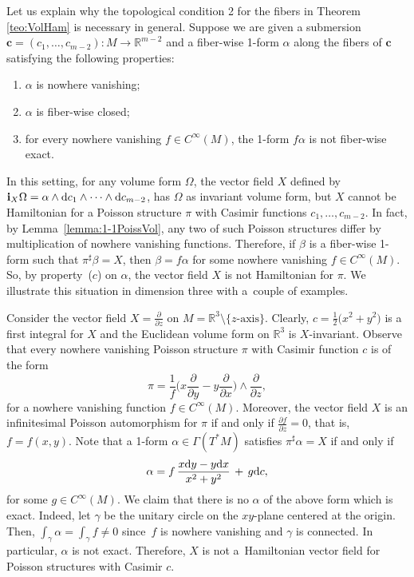 \documentclass[pdftex]{sigma}%
\newcommand{\R}[1]{\mathbb{R}^{#1}}
\newcommand{\dd}{{\rm d}}
\newcommand{\ii}{\mathbf{i}}
\numberwithin{equation}{section}
\begin{document}
Let us explain why the topological condition 2 for the fibers in Theorem \ref{teo:VolHam} is necessary in general. Suppose we are given a submersion $\boldsymbol{c}=(c_1, \dots, c_{m-2})\colon M \to \R{m-2}$ and a fiber-wise 1-form $\alpha$ along the fibers of $\boldsymbol{c}$ satisfying the following properties:
 \begin{enumerate}\itemsep=0pt
 \item[$(a)$] $\alpha$ is nowhere vanishing;
 \item[$(b)$] $\alpha$ is fiber-wise closed;
 \item[$(c)$] for every nowhere vanishing $f\in C^{\infty}(M)$, the 1-form $f\alpha$ is not fiber-wise exact.
 \end{enumerate}
In this setting, for any volume form $\Omega$, the vector field $X$ defined by $\ii_{X}\Omega = \alpha \wedge \dd c_{1}\wedge \dots \wedge \dd c_{m-2}$, has $\Omega$ as invariant volume form, but $X$ cannot be Hamiltonian for a Poisson structure $\pi$ with Casimir functions $c_1, \dots, c_{m-2}$. In fact, by Lemma~\ref{lemma:1-1PoissVol}, any two of such Poisson structures differ by multiplication of nowhere vanishing functions. Therefore, if $\beta$ is a fiber-wise 1-form such that $\pi^{\sharp}\beta = X$, then $\beta = f\alpha$ for some nowhere vanishing $f \in C^{\infty}(M)$. So, by property~($c$) on $\alpha$, the vector field $X$ is not Hamiltonian for $\pi$. We illustrate this situation in dimension three with a~couple of examples.

\begin{Example}\label{exm:37}
Consider the vector field $X = \tfrac{\partial}{\partial z}$ on $M = \R{3} \setminus\{z\text{-axis}\}$. Clearly, $c= \frac{1}{2}\big(x^2 + y^2\big)$ is a first integral for $X$ and the Euclidean volume form on $\R{3}$ is $X$-invariant. Observe that every nowhere vanishing Poisson structure $\pi$ with Casimir function $c$ is of the form
 \begin{equation*}
 \pi = \frac{1}{f}\bigg(x\frac{\partial}{\partial y}- y\frac{\partial}{\partial x}\bigg)\wedge\frac{\partial}{\partial z},
 \end{equation*}
for a nowhere vanishing function $f \in C^{\infty}(M)$. Moreover, the vector field $X$ is an infinitesimal Poisson automorphism for $\pi$ if and only if $\frac{\partial f}{\partial z} = 0$, that is, $f = f(x,y)$. Note that a 1-form $\alpha \in \Gamma(T^{*}M)$ satisfies $\pi^{\sharp}\alpha = X$ if and only if
 \begin{equation*}
 \alpha = f\,\frac{x\dd y - y\dd x}{x^2+y^2} \,+\, g\dd c,
 \end{equation*}
for some $g \in C^{\infty}(M)$. We claim that there is no $\alpha$ of the above form which is exact. Indeed, let $\gamma$ be the unitary circle on the $xy$-plane centered at the origin. Then, $\int_{\gamma}\alpha = \int_{\gamma}f \neq 0$ since~$f$ is nowhere vanishing and $\gamma$ is connected. In particular, $\alpha$ is not exact. Therefore, $X$ is not a~Hamiltonian vector field for Poisson structures with Casimir $c$.
\end{Example}
\end{document}
